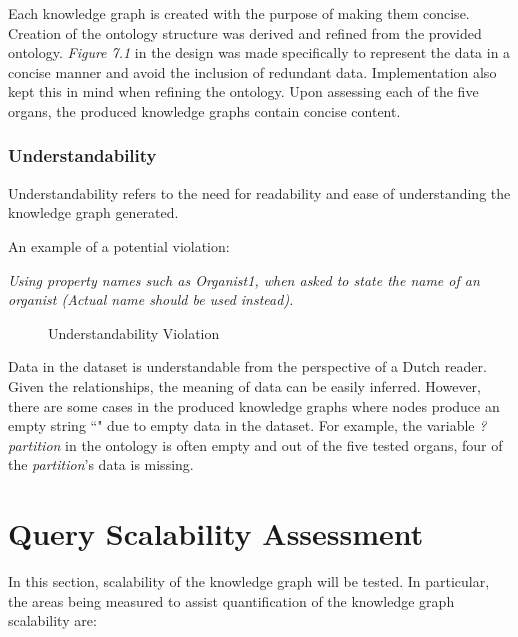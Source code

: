 Each knowledge graph is created with the purpose of making them concise. Creation of the ontology structure was derived and refined from the provided ontology. \textit{Figure 7.1} in the design was made specifically to represent the data in a concise manner and avoid the inclusion of redundant data. Implementation also kept this in mind when refining the ontology. Upon assessing each of the five organs, the produced knowledge graphs contain concise content.

\subsubsection{Understandability}
\hspace{0.5cm} Understandability refers to the need for readability and ease of understanding the knowledge graph generated. \cite{knowledgegraphevaulationbook}

\noindent An example of a potential violation: 
\vspace{-0.1cm}
\begin{displayquote}
    \textit{Using property names such as Organist1, when asked to state the name of an organist (Actual name should be used instead).}
\end{displayquote}

\begin{figure}[H]
\begin{center}
\end{center}
\vspace{-0.5cm}
\caption{Understandability Violation}
\end{figure}

Data in the dataset is understandable from the perspective of a Dutch reader. Given the relationships, the meaning of data can be easily inferred. However, there are some cases in the produced knowledge graphs where nodes produce an empty string ``" due to empty data in the dataset. For example, the variable \textit{?partition} in the ontology is often empty and out of the five tested organs, four of the \textit{partition}'s data is missing. 

\section{Query Scalability Assessment}
In this section, scalability of the knowledge graph will be tested. In particular, the areas being measured to assist quantification of the knowledge graph scalability are: 

